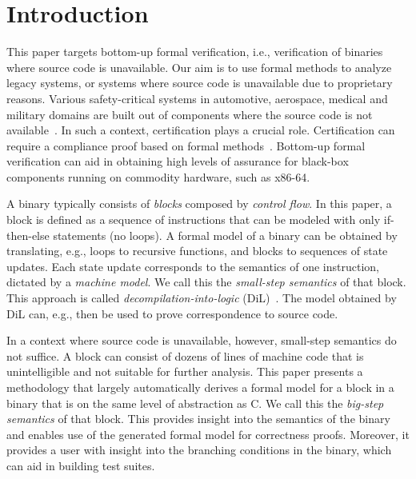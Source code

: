 

\section{Introduction}


This paper targets bottom-up formal verification, i.e., verification of binaries where source code is unavailable.
Our aim is to use formal methods to analyze legacy systems, or systems where source code is unavailable due to proprietary reasons.
Various safety-critical systems in automotive, aerospace, medical and military domains are built out of components where the source code is not available~\cite{sulaman2014development}.
In such a context, certification plays a crucial role.
Certification can require a compliance proof based on formal methods~\cite{rushby1997formal,Woodcock09}.
Bottom-up formal verification can aid in obtaining high levels of assurance for black-box components running on commodity hardware, such as x86-64.

A binary typically consists of \emph{blocks} composed by \emph{control flow}.
In this paper, a block is defined as a sequence of instructions that can be modeled with only if-then-else statements (no loops).
A formal model of a binary can be obtained by translating, e.g., loops to recursive functions, and blocks to sequences of state updates.
Each state update corresponds to the semantics of one instruction, dictated by a \emph{machine model}.
We call this the \emph{small-step semantics} of that block.
This approach is called \emph{decompilation-into-logic} (DiL)~\cite{4689183,myreen2012decompilation}.
The model obtained by DiL can, e.g., then be used to prove correspondence to source code.

In a context where source code is unavailable, however, small-step semantics do not suffice.
A block can consist of dozens of lines of machine code that is unintelligible and not suitable for further analysis.
This paper presents a methodology that largely automatically derives a formal model for a block in a binary that is on the same level of abstraction as C.
We call this the \emph{big-step semantics} of that block.
This provides insight into the semantics of the binary and enables use of the generated formal model for correctness proofs.
Moreover, it provides a user with insight into the branching conditions in the binary, which can aid in building test suites.


